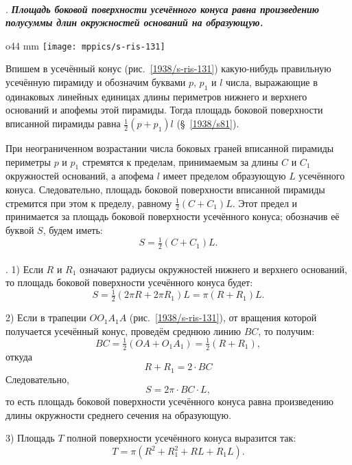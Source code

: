 \paragraph{}\label{1938/s116}
.
\textbf{\emph{Площадь боковой поверхности усечённого конуса равна произведению полусуммы длин окружностей оснований на образующую.}}

\begin{wrapfigure}{o}{44 mm}
\vskip-0mm
\centering
\texttt{[image: mppics/s-ris-131]}
\caption{}\label{1938/s-ris-131}
\vskip-0mm
\end{wrapfigure}

Впишем в усечённый конус (рис.~\ref{1938/s-ris-131}) какую-нибудь правильную усечённую пирамиду и обозначим буквами $p$, $p_1$ и $l$ числа, выражающие в одинаковых линейных единицах длины периметров нижнего и верхнего оснований и апофемы этой пирамиды.
Тогда площадь боковой поверхности вписанной пирамиды равна $\tfrac12 (p+p_1)l$ (§~\ref{1938/s81}).

При неограниченном возрастании числа боковых граней вписанной пирамиды периметры $p$ и $p_1$ стремятся к пределам, принимаемым за длины $C$ и $C_1$ окружностей оснований, а апофема $l$ имеет пределом образующую $L$ усечённого конуса.
Следовательно, площадь боковой поверхности вписанной пирамиды стремится при этом к пределу, равному $\tfrac12(C + C_1)L$.
Этот предел и принимается за площадь боковой поверхности усечённого конуса;
обозначив её буквой $S$, будем иметь:
\[S=\tfrac12 (C+C_1)L.\]

\paragraph{}\label{1938/s117}
. 1) Если $R$ и $R_1$ означают радиусы окружностей нижнего и верхнего оснований, то площадь боковой поверхности усечённого конуса будет:
\[S = \tfrac12(2\pi R + 2\pi R_1)L = \pi (R + R_1)L.\]

2) Если в трапеции $OO_1A_1A$ (рис.~\ref{1938/s-ris-131}), от вращения которой получается усечённый конус, проведём среднюю линию $BC$, то получим:
\[BC = \tfrac12(OA + O_1A_1) = \tfrac12(R + R_1),\]
откуда
\[R + R_1=2\cdot BC\]
Следовательно,
\[S = 2\pi\cdot BC\cdot L,\]
то есть площадь боковой поверхности усечённого конуса равна произведению длины окружности среднего сечения на образующую.

3) Площадь $T$ полной поверхности усечённого конуса выразится так:
\[T = \pi (R^2 + R_1^2 + RL + R_1L).\]

